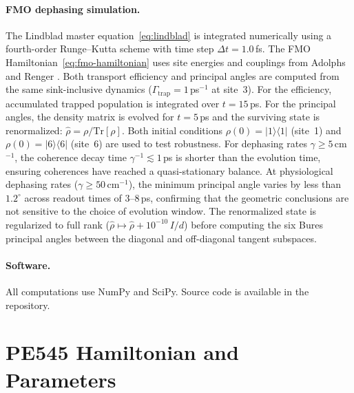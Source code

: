 \documentclass[12pt,a4paper]{article}
\theoremstyle{definition}
\theoremstyle{remark}
\begin{document}
\paragraph{FMO dephasing simulation.}
The Lindblad master equation~\eqref{eq:lindblad} is integrated numerically using a fourth-order Runge--Kutta scheme with time step $\Delta t = 1.0$\,fs. The FMO Hamiltonian~\eqref{eq:fmo-hamiltonian} uses site energies and couplings from Adolphs and Renger \cite{adolphs2006proteins}. Both transport efficiency and principal angles are computed from the same sink-inclusive dynamics ($\Gamma_{\mathrm{trap}} = 1$\,ps$^{-1}$ at site~3). For the efficiency, accumulated trapped population is integrated over $t = 15$\,ps. For the principal angles, the density matrix is evolved for $t = 5$\,ps and the surviving state is renormalized: $\hat{\rho} = \rho/\mathrm{Tr}[\rho]$. Both initial conditions $\rho(0) = |1\rangle\langle 1|$ (site~1) and $\rho(0) = |6\rangle\langle 6|$ (site~6) are used to test robustness. For dephasing rates $\gamma \geq 5$\,cm$^{-1}$, the coherence decay time $\gamma^{-1} \lesssim 1$\,ps is shorter than the evolution time, ensuring coherences have reached a quasi-stationary balance. At physiological dephasing rates ($\gamma \geq 50$\,cm$^{-1}$), the minimum principal angle varies by less than $1.2^\circ$ across readout times of 3--8\,ps, confirming that the geometric conclusions are not sensitive to the choice of evolution window. The renormalized state is regularized to full rank ($\hat{\rho} \mapsto \hat{\rho} + 10^{-10}\,I/d$) before computing the six Bures principal angles between the diagonal and off-diagonal tangent subspaces.

\paragraph{Software.}
All computations use NumPy and SciPy. Source code is available in the repository.

\section{PE545 Hamiltonian and Parameters}
\label{app:pe545}
\end{document}
